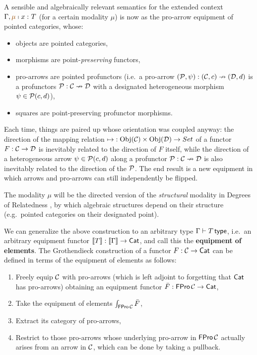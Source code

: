 \documentclass{lmcs} %
\theoremstyle{plain}\newtheorem{satz}[thm]{Satz} %
\theoremstyle{plain}
\theoremstyle{definition}
\begin{document}
A sensible and algebraically relevant semantics for the extended context $\Gamma, \ctxmodnovar \mu x T$ (for a certain modality $\mu$) is now as the pro-arrow equipment of pointed categories, whose:
\begin{itemize}
	\item objects are pointed categories,
	\item morphisms are point-\emph{preserving} functors,
	\item pro-arrows are pointed profunctors (i.e.\ a pro-arrow $({\mathcal{P}}, \psi) : ({\mathcal{C}}, c) \nrightarrow ({\mathcal{D}}, d)$ is a profunctors ${\mathcal{P}} : {\mathcal{C}} \nrightarrow {\mathcal{D}}$ with a designated heterogeneous morphism $\psi \in {\mathcal{P}}(c, d)$),
	\item squares are point-preserving profunctor morphisms.
\end{itemize}
Each time, things are paired up whose orientation was coupled anyway: the direction of the mapping relation ${\mapsto} : \mathrm{Obj}(\mathcal{C}) \times \mathrm{Obj}({\mathcal{D}}) \to Set$ of a functor $F : {\mathcal{C}} \to {\mathcal{D}}$ is inevitably related to the direction of $F$ itself, while the direction of a heterogeneous arrow $\psi \in {\mathcal{P}}(c, d)$ along a profunctor ${\mathcal{P}} : {\mathcal{C}} \nrightarrow {\mathcal{D}}$ is also inevitably related to the direction of the ${\mathcal{P}}$.
The end result is a new equipment in which arrows and pro-arrows can still independently be flipped.

The modality $\mu$ will be the directed version of the \emph{structural} modality in Degrees of Relatedness \cite{reldtt}, by which algebraic structures depend on their structure (e.g.\ pointed categories on their designated point).

We can generalize the above construction to an arbitrary type $\Gamma \vdash T \,\mathsf{type}$, i.e.\ an arbitrary equipment functor $\mathopen{}\left\llbracket T \right\rrbracket\mathclose{} : \mathopen{}\left\llbracket \Gamma \right\rrbracket\mathclose{} \to {\mathsf{Cat}}$, and call this the \textbf{equipment of elements}.
The Grothendieck construction of a functor $F : {\mathcal{C}} \to {\mathsf{Cat}}$ can be defined in terms of the equipment of elements as follows:
\begin{enumerate}
	\item Freely equip ${\mathcal{C}}$ with pro-arrows (which is left adjoint to forgetting that ${\mathsf{Cat}}$ has pro-arrows) obtaining an equipment functor $\bar F : \mathsf{FPro}\,{\mathcal{C}} \to {\mathsf{Cat}}$,
	\item Take the equipment of elements $\int_{\mathsf{FPro}\,{\mathcal{C}}} \bar F$,
	\item Extract its category of pro-arrows,
	\item Restrict to those pro-arrows whose underlying pro-arrow in $\mathsf{FPro}\,{\mathcal{C}}$ actually arises from an arrow in ${\mathcal{C}}$, which can be done by taking a pullback.
\end{enumerate}
\end{document}
